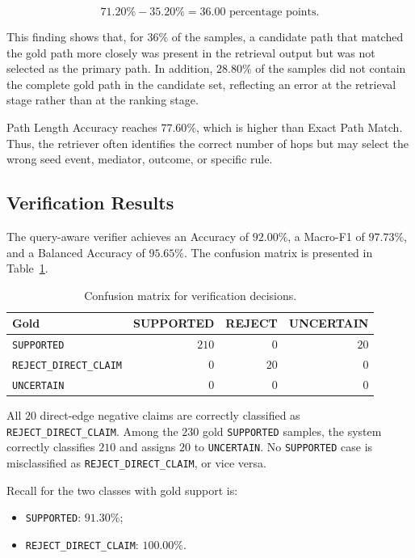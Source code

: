 \[
71.20\% - 35.20\% = 36.00
\text{ percentage points}.
\]

This finding shows that, for \(36\%\) of the samples, a candidate path that
matched the gold path more closely was present in the retrieval output but
was not selected as the primary path. In addition, \(28.80\%\) of the
samples did not contain the complete gold path in the candidate set,
reflecting an error at the retrieval stage rather than at the ranking stage.

Path Length Accuracy reaches \(77.60\%\), which is higher than Exact Path
Match. Thus, the retriever often identifies the correct number of hops but
may select the wrong seed event, mediator, outcome, or specific rule.

\subsection{Verification Results}

The query-aware verifier achieves an Accuracy of \(92.00\%\), a Macro-F1 of
\(97.73\%\), and a Balanced Accuracy of \(95.65\%\). The confusion matrix is
presented in Table~\ref{tab:verification-confusion}.

\begin{table}[t]
    \centering
    \caption{Confusion matrix for verification decisions.}
    \label{tab:verification-confusion}
    \begin{tabular}{lrrr}
        \hline
        \textbf{Gold} &
        \textbf{SUPPORTED} &
        \textbf{REJECT} &
        \textbf{UNCERTAIN} \\
        \hline
        \texttt{SUPPORTED} & \(210\) & \(0\) & \(20\) \\
        \texttt{REJECT\_DIRECT\_CLAIM} & \(0\) & \(20\) & \(0\) \\
        \texttt{UNCERTAIN} & \(0\) & \(0\) & \(0\) \\
        \hline
    \end{tabular}
\end{table}

All \(20\) direct-edge negative claims are correctly classified as
\texttt{REJECT\_DIRECT\_CLAIM}. Among the \(230\) gold
\texttt{SUPPORTED} samples, the system correctly classifies \(210\) and
assigns \(20\) to \texttt{UNCERTAIN}. No \texttt{SUPPORTED} case is
misclassified as \texttt{REJECT\_DIRECT\_CLAIM}, or vice versa.

Recall for the two classes with gold support is:

\begin{itemize}
    \item \texttt{SUPPORTED}: \(91.30\%\);
    \item \texttt{REJECT\_DIRECT\_CLAIM}: \(100.00\%\).
\end{itemize}

